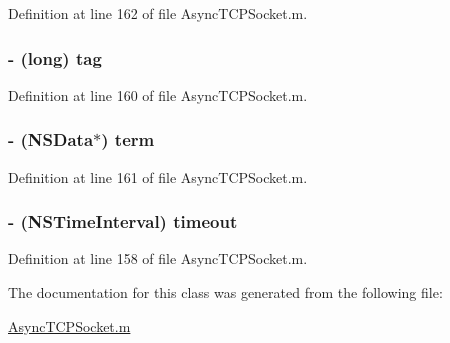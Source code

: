 Definition at line 162 of file AsyncTCPSocket.m.

\hypertarget{interface_async_read_packet_ae10c29173f0af40507d7e787905c7130}{
\subsubsection[{tag}]{\setlength{\rightskip}{0pt plus 5cm}-\/ (long) {\bf tag}}}
\label{interface_async_read_packet_ae10c29173f0af40507d7e787905c7130}


Definition at line 160 of file AsyncTCPSocket.m.

\hypertarget{interface_async_read_packet_ac09dba8aa168ea0ea2797060e554412e}{
\subsubsection[{term}]{\setlength{\rightskip}{0pt plus 5cm}-\/ (NSData$\ast$) {\bf term}}}
\label{interface_async_read_packet_ac09dba8aa168ea0ea2797060e554412e}


Definition at line 161 of file AsyncTCPSocket.m.

\hypertarget{interface_async_read_packet_a39233eb85b4cbae04411577510e7c5e6}{
\subsubsection[{timeout}]{\setlength{\rightskip}{0pt plus 5cm}-\/ (NSTimeInterval) {\bf timeout}}}
\label{interface_async_read_packet_a39233eb85b4cbae04411577510e7c5e6}


Definition at line 158 of file AsyncTCPSocket.m.



The documentation for this class was generated from the following file:\begin{DoxyCompactItemize}
\item 
\hyperlink{_async_t_c_p_socket_8m}{AsyncTCPSocket.m}\end{DoxyCompactItemize}
